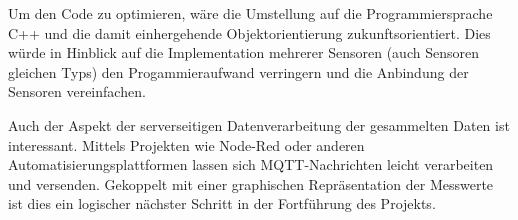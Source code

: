 \smallskip

Um den Code zu optimieren, wäre die Umstellung auf die Programmiersprache C++ und die damit einhergehende Objektorientierung zukunftsorientiert. Dies würde in Hinblick
auf die Implementation mehrerer Sensoren (auch Sensoren gleichen Typs) den Progammieraufwand verringern und die Anbindung der Sensoren vereinfachen.

\smallskip

Auch der Aspekt der serverseitigen Datenverarbeitung der gesammelten Daten ist interessant. Mittels Projekten wie Node-Red oder anderen Automatisierungsplattformen 
lassen sich \ac{MQTT}-Nachrichten leicht verarbeiten und versenden. Gekoppelt mit einer graphischen Repräsentation der Messwerte ist dies ein logischer 
nächster Schritt in der Fortführung des Projekts.